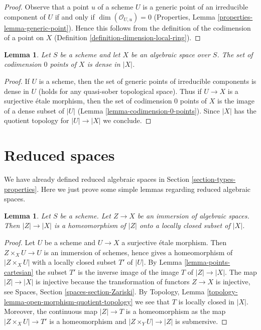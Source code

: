 \documentclass{stacks-project}
\theoremstyle{plain}
\newtheorem{lemma}[subsection]{Lemma}
\theoremstyle{definition}
\theoremstyle{remark}
\numberwithin{equation}{subsection}
\begin{document}
\begin{proof}
Observe that a point $u$ of a scheme $U$ is a generic point of an
irreducible component of $U$ if and only if $\dim(\mathcal{O}_{U, u}) = 0$
(Properties, Lemma \ref{properties-lemma-generic-point}).
Hence this follows from the definition of the codimension of a
point on $X$ (Definition \ref{definition-dimension-local-ring}).
\end{proof}

\begin{lemma}
\label{lemma-codimension-0-points-dense}
Let $S$ be a scheme and let $X$ be an algebraic space over $S$.
The set of codimension $0$ points of $X$ is dense in $|X|$.
\end{lemma}

\begin{proof}
If $U$ is a scheme, then the set of generic points of irreducible
components is dense in $U$ (holds for any quasi-sober topological space).
Thus if $U \to X$ is a surjective \'etale morphism, then the set
of codimension $0$ points of $X$ is the image of a dense subset of
$|U|$ (Lemma \ref{lemma-codimension-0-points}). Since $|X|$ has the
quotient topology for $|U| \to |X|$ we conclude.
\end{proof}





\section{Reduced spaces}
\label{section-reduced}

\noindent
We have already defined reduced algebraic spaces in
Section \ref{section-types-properties}.
Here we just prove some simple lemmas regarding reduced algebraic
spaces.

\begin{lemma}
\label{lemma-subspace-induced-topology}
Let $S$ be a scheme. Let $Z \to X$ be an immersion of algebraic spaces.
Then $|Z| \to |X|$ is a homeomorphism of $|Z|$ onto a locally closed subset
of $|X|$.
\end{lemma}

\begin{proof}
Let $U$ be a scheme and $U \to X$ a surjective \'etale morphism.
Then $Z \times_X U \to U$ is an immersion of schemes, hence gives a
homeomorphism of $|Z \times_X U|$ with a locally closed subset $T'$
of $|U|$. By Lemma \ref{lemma-points-cartesian} the subset
$T'$ is the inverse image of the image $T$ of $|Z| \to |X|$.
The map $|Z| \to |X|$ is injective because the transformation of
functors $Z \to X$ is injective, see
Spaces, Section \ref{spaces-section-Zariski}. By
Topology, Lemma \ref{topology-lemma-open-morphism-quotient-topology}
we see that $T$ is locally closed in $|X|$. Moreover, the continuous
map $|Z| \to T$ is a homeomorphism as the map $|Z \times_X U| \to T'$
is a homeomorphism and $|Z \times_Y U| \to |Z|$ is submersive.
\end{proof}
\end{document}
